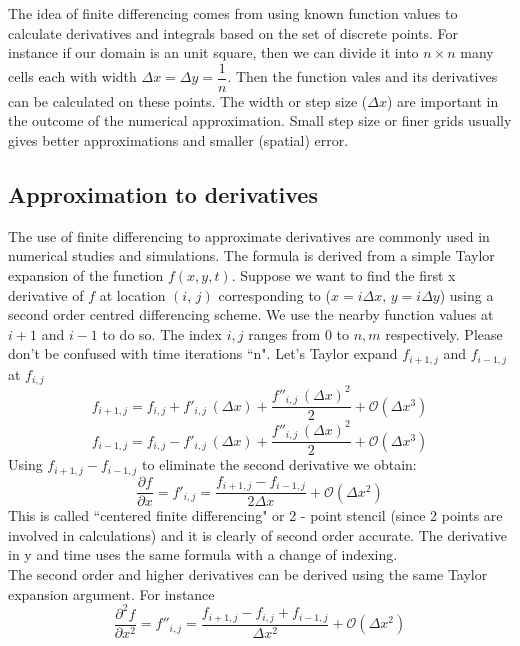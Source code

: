 The idea of finite differencing comes from using known function values to calculate derivatives and integrals based on the set of discrete points. For instance if our domain is an unit square, then we can divide it into $n \times n$ many cells each with width $\Delta x = \Delta y = \dfrac{1}{n}$. Then the function vales and its derivatives can be calculated on these points. The width or step size ($\Delta x$) are important in the outcome of the numerical approximation. Small step size or finer grids usually gives better approximations and smaller (spatial) error.

\subsection{Approximation to derivatives}
The use of finite differencing to approximate derivatives are commonly used in numerical studies and simulations. The formula is derived from a simple Taylor expansion of the function $f(x,y,t)$. Suppose we want to find the first x derivative of $f$ at location $(i,\,j)$ corresponding to ($x= i \Delta x,\, y= i\Delta y$) using a second order centred differencing scheme. We use the nearby function values at $i+1$ and $i-1$ to do so. The index $i,j$ ranges from 0 to $n,m$ respectively. Please don't be confused with time iterations ``n". Let's Taylor expand $f_{i+1,j}$ and $f_{i-1,j}$ at $f_{i,j}$
\begin{equation*}
f_{i+1,j} = f_{i,j} + f'_{i,j}\,(\Delta x)+\dfrac{f''_{i,j}\,(\Delta x)^2}{2} + \mathcal{O}(\Delta x^3)
\end{equation*}
\begin{equation*}
f_{i-1,j} = f_{i,j} - f'_{i,j}\,(\Delta x)+\dfrac{f''_{i,j}\,(\Delta x)^2}{2} + \mathcal{O}(\Delta x^3)
\end{equation*}
Using $f_{i+1,j} - f_{i-1,j}$ to eliminate the second derivative we obtain:
\begin{equation*}
\dfrac{\partial f}{\partial x} = f'_{i,j} = \dfrac{f_{i+1,j} - f_{i-1,j}}{2\Delta x} + \mathcal{O}(\Delta x^2)
\end{equation*}
This is called ``centered finite differencing" or 2 - point stencil (since 2 points are involved in calculations) and it is clearly of second order accurate. The derivative in y and time uses the same formula with a change of indexing.\\

The second order and higher derivatives can be derived using the same Taylor expansion argument. For instance
\begin{equation*}
\dfrac{\partial^2 f}{\partial x^2} = f''_{i,j} = \dfrac{f_{i+1,j} - f_{i,j} + f_{i-1,j}}{\Delta x^2} + \mathcal{O}(\Delta x^2)
\end{equation*}

